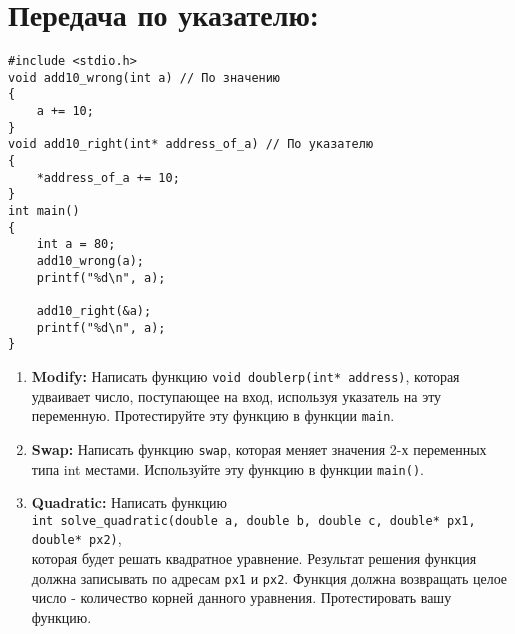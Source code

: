 \documentclass{article}
\begin{document}
\section*{Передача по указателю:}
\begin{lstlisting}
#include <stdio.h>
void add10_wrong(int a) // По значению
{
	a += 10;
}
void add10_right(int* address_of_a) // По указателю
{
	*address_of_a += 10;
}
int main()
{
	int a = 80;
	add10_wrong(a);
	printf("%d\n", a); 
	    
	add10_right(&a);
	printf("%d\n", a); 
}
\end{lstlisting}

\begin{enumerate}
\item \textbf{Modify:} Написать функцию \texttt{void doublerp(int* address)}, которая удваивает число, поступающее на вход, используя указатель на эту переменную. Протестируйте эту функцию в функции \texttt{main}.
\item \textbf{Swap:} Написать функцию \texttt{swap}, которая меняет значения 2-х переменных типа int местами. Используйте эту функцию в функции \texttt{main()}.
\item \textbf{Quadratic:} Написать функцию \\
\texttt{int solve\_quadratic(double a, double b, double c, double* px1, double* px2)},\\
которая будет решать квадратное уравнение. Результат решения функция должна записывать по адресам \texttt{px1} и \texttt{px2}. Функция должна возвращать целое число - количество корней данного уравнения. Протестировать вашу функцию.
\end{enumerate}
\end{document}
